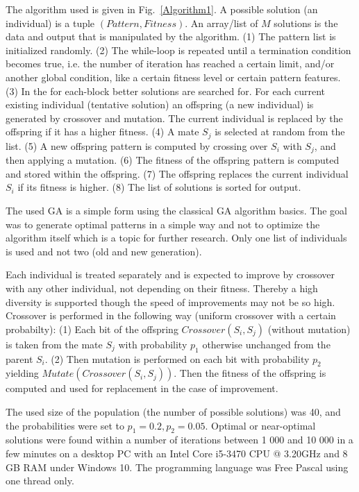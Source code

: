 \documentclass[10pt,a4paper]{article}  %
\begin{document}
The algorithm used is given in Fig.~\ref{Algorithm1}.
A possible solution (an individual) is a tuple $(Pattern, Fitness)$.
An array/list of $M$ solutions  is the data and output that is manipulated  by the algorithm.
(1) The pattern list is initialized randomly. 
(2) The while-loop is repeated until a termination condition becomes true, i.e. 
the number of iteration has reached a certain limit, and/or
another global condition, like a certain fitness level or certain pattern features.
(3) 
In the for each-block better solutions are searched for.
For each current existing individual (tentative solution)
an offspring (a new individual) is generated by crossover and mutation.
The current individual is replaced by the offspring if it has a higher fitness. 
(4) A mate  $S_j$ is selected at random from the list. 
(5) A new offspring pattern is computed by crossing over $S_i$ with $S_j$,
and then applying a mutation. 
(6) The fitness of the offspring pattern is computed and stored within the offspring.
(7) The offspring replaces the current individual $S_i$
if its fitness is higher.
(8) The list of solutions is sorted for output. 



The used GA is a simple form using the classical GA algorithm basics.
The goal was to generate optimal patterns in a simple way and not to 
optimize the algorithm itself which is a topic for further research. 
Only one list of individuals is used and not two (old and new generation).

Each individual is treated separately and is expected to improve by crossover
with any other individual, not depending on their fitness. 
Thereby a high diversity is supported though the speed of improvements may not be so high.  
Crossover is performed in the following way (uniform crossover with a certain probabilty):
(1) Each bit of the offspring $\textit{Crossover}(S_i, S_j)$
(without mutation) is taken from
the mate $S_j$ with probability $p_1$
otherwise unchanged from the parent $S_i$.
(2) Then mutation is performed on each bit with probability $p_2$ yielding 
$Mutate(Crossover(S_i, S_j))$.
Then the fitness of the offspring is computed and used for replacement
in the case of improvement. 

The used size of the population (the number of possible solutions) was 40,
and the probabilities  were set to $p_1= 0.2, p_2=0.05$.
Optimal or near-optimal solutions were found within a number of iterations between 1 000 and 10 000
in a few minutes 
on a desktop PC with an Intel Core i5-3470 CPU @ 3.20GHz and 8 GB RAM
under Windows 10. The programming language was Free Pascal using one thread only. 
\end{document}
